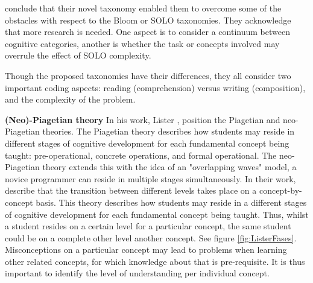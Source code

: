  conclude that their novel taxonomy enabled them to overcome some of the obstacles with respect to the Bloom or SOLO taxonomies. They acknowledge that more research is needed. One aspect is to consider a continuum between cognitive categories, another is whether the task or concepts involved may overrule the effect of SOLO complexity.



Though the proposed taxonomies have their differences, they all consider two important coding aspects: reading (comprehension) versus writing (composition), and the complexity of the problem.



\newline \noindent \textbf{(Neo)-Piagetian theory}\newline
In his work, Lister \citeyear{lister2010naturally}, \citeyear{lister2016toward} position the Piagetian and neo-Piagetian theories. The Piagetian theory describes how students may reside in different stages of cognitive development for each fundamental concept being taught: pre-operational, concrete operations, and formal operational. The neo-Piagetian theory extends this with the idea of an "overlapping waves" model, a novice programmer can reside in multiple stages simultaneously. In their work,  describe that the transition between different levels takes place on a concept-by-concept basis. This theory describes how students may reside in a different stages of cognitive development for each fundamental concept being taught. Thus, whilst a student resides on a certain level for a particular concept, the same student could be on a complete other level another concept. See figure \ref{fig:ListerFases}. Misconceptions on a particular concept may lead to problems when learning other related concepts, for which knowledge about that is pre-requisite. It is thus important to identify the level of understanding per individual concept.


